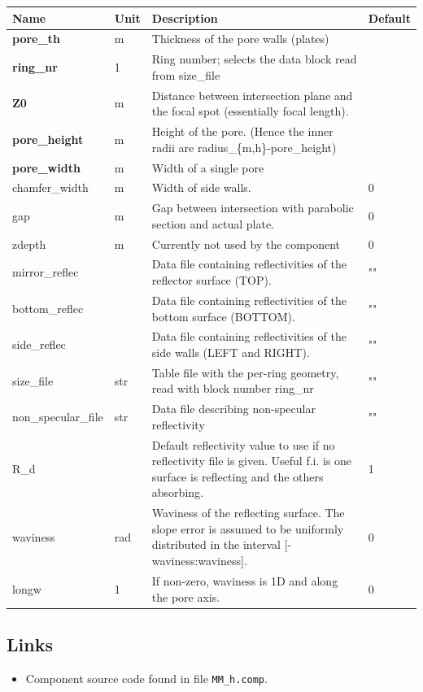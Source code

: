 \begin{longtable}{p{}p{}p{}p{}}
\toprule
\textbf{Name} & \textbf{Unit} & \textbf{Description} & \textbf{Default} \\
\midrule
\endhead
\textbf{pore\_th} & m & Thickness of the pore walls (plates) &  \\
\textbf{ring\_nr} & 1 & Ring number; selects the data block read from size\_file &  \\
\textbf{Z0} & m & Distance between intersection plane and the focal spot (essentially focal length). &  \\
\textbf{pore\_height} & m & Height of the pore. (Hence the inner radii are radius\_\{m,h\}-pore\_height) &  \\
\textbf{pore\_width} & m & Width of a single pore &  \\
chamfer\_width & m & Width of side walls. & 0 \\
gap & m & Gap between intersection with parabolic section and actual plate. & 0 \\
zdepth & m & Currently not used by the component & 0 \\
mirror\_reflec &   & Data file containing reflectivities of the reflector surface (TOP). & "" \\
bottom\_reflec &   & Data file containing reflectivities of the bottom surface (BOTTOM). & "" \\
side\_reflec &   & Data file containing reflectivities of the side walls (LEFT and RIGHT). & "" \\
size\_file & str & Table file with the per-ring geometry, read with block number ring\_nr & "" \\
non\_specular\_file & str & Data file describing non-specular reflectivity & "" \\
R\_d &   & Default reflectivity value to use if no reflectivity file is given. Useful f.i. is one surface is reflecting and the others absorbing. & 1 \\
waviness & rad & Waviness of the reflecting surface. The slope error is assumed to be uniformly distributed in the interval [-waviness:waviness]. & 0 \\
longw & 1 & If non-zero, waviness is 1D and along the pore axis. & 0 \\
\bottomrule
\end{longtable}

\subsection*{Links}
\begin{itemize}
  \item Component source code found in file \texttt{MM\_h.comp}.
\end{itemize}
